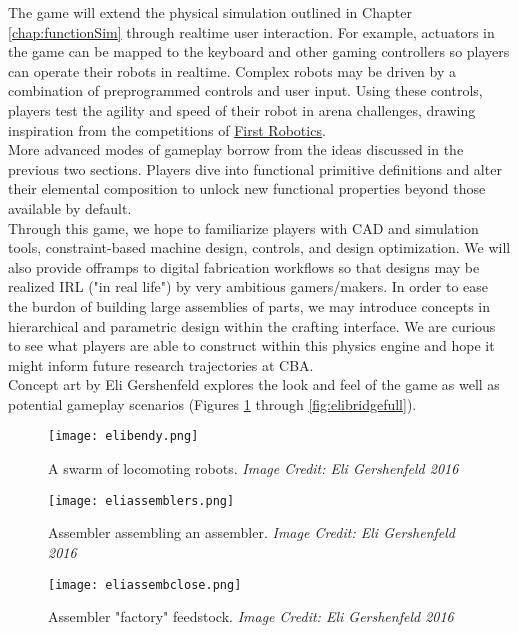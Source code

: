 {The game will extend the physical simulation outlined in Chapter \ref{chap:functionSim} through realtime user interaction.  For example, actuators in the game can be mapped to the keyboard and other gaming controllers so players can operate their robots in realtime.  Complex robots may be driven by a combination of preprogrammed controls and user input.  Using these controls, players test the agility and speed of their robot in arena challenges, drawing inspiration from the competitions of \href{http://www.firstinspires.org/robotics/frc}{First Robotics}.\\

More advanced modes of gameplay borrow from the ideas discussed in the previous two sections.  Players dive into functional primitive definitions and alter their elemental composition to unlock new functional properties beyond those available by default.\\

Through this game, we hope to familiarize players with CAD and simulation tools, constraint-based machine design, controls, and design optimization.  We will also provide offramps to digital fabrication workflows so that designs may be realized IRL ("in real life") by very ambitious gamers/makers.  In order to ease the burdon of building large assemblies of parts, we may introduce concepts in hierarchical and parametric design within the crafting interface.  We are curious to see what players are able to construct within this physics engine and hope it might inform future research trajectories at CBA.
\\

Concept art by Eli Gershenfeld explores the look and feel of the game as well as potential gameplay scenarios (Figures \ref{fig:elibendy} through \ref{fig:elibridgefull}).

\clearpage

\begin{figure}
  \texttt{[image: elibendy.png]}
  \caption{A swarm of locomoting robots.  \textit{Image Credit: Eli Gershenfeld 2016}}
  \label{fig:elibendy}
\end{figure}

\begin{figure}
  \texttt{[image: eliassemblers.png]}
  \caption{Assembler assembling an assembler.  \textit{Image Credit: Eli Gershenfeld 2016}}
  \label{fig:eliassemblers}
\end{figure}

\begin{figure}
  \texttt{[image: eliassembclose.png]}
  \caption{Assembler "factory" feedstock.  \textit{Image Credit: Eli Gershenfeld 2016}}
  \label{fig:eliassembclose}
\end{figure}

}
